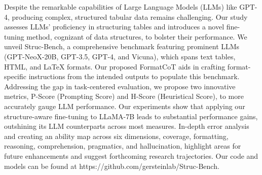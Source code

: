 Despite the remarkable capabilities of Large Language Models (LLMs) like GPT-4, producing complex, structured tabular data remains challenging. Our study assesses LLMs' proficiency in structuring tables and introduces a novel fine-tuning method, cognizant of data structures, to bolster their performance. We unveil Struc-Bench, a comprehensive benchmark featuring prominent LLMs (GPT-NeoX-20B, GPT-3.5, GPT-4, and Vicuna), which spans text tables, HTML, and LaTeX formats. Our proposed FormatCoT aids in crafting format-specific instructions from the intended outputs to populate this benchmark. Addressing the gap in task-centered evaluation, we propose two innovative metrics, P-Score (Prompting Score) and H-Score (Heuristical Score), to more accurately gauge LLM performance. Our experiments show that applying our structure-aware fine-tuning to LLaMA-7B leads to substantial performance gains, outshining its LLM counterparts across most measures. In-depth error analysis and creating an ability map across six dimensions, coverage, formatting, reasoning, comprehension, pragmatics, and hallucination, highlight areas for future enhancements and suggest forthcoming research trajectories. Our code and models can be found at https://github.com/gersteinlab/Struc-Bench.